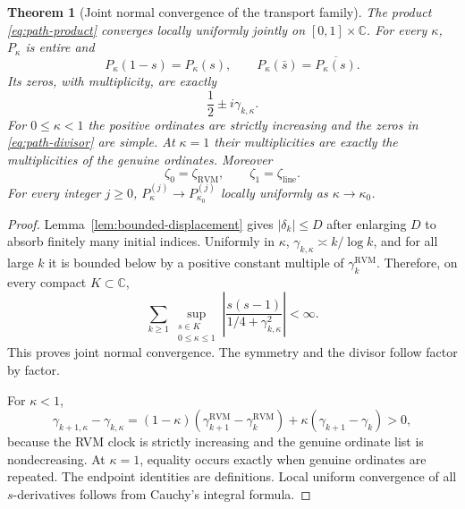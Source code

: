 \documentclass[11pt,reqno]{amsart}
\newtheorem{theorem}{Theorem}[section]
\theoremstyle{definition}
\theoremstyle{remark}
\newcommand{\C}{\mathbb C}
\newcommand{\RVM}{\mathrm{RVM}}
\newcommand{\linez}{\mathrm{line}}
\begin{document}
\begin{theorem}[Joint normal convergence of the transport family]\label{thm:path}
The product \eqref{eq:path-product} converges locally uniformly jointly on $[0,1]\times\C$.  For every $\kappa$, $P_\kappa$ is entire and
\begin{equation}
 P_\kappa(1-s)=P_\kappa(s),
 \qquad
 P_\kappa(\bar s)=\overline{P_\kappa(s)}.
\end{equation}
Its zeros, with multiplicity, are exactly
\begin{equation}\label{eq:path-divisor}
 \frac12\pm i\gamma_{k,\kappa}.
\end{equation}
For $0\le\kappa<1$ the positive ordinates are strictly increasing and the zeros in \eqref{eq:path-divisor} are simple.  At $\kappa=1$ their multiplicities are exactly the multiplicities of the genuine ordinates.  Moreover
\begin{equation}\label{eq:path-endpoints}
 \boxed{
 \zeta_0=\zeta_{\RVM},
 \qquad
 \zeta_1=\zeta_{\linez}.}
\end{equation}
For every integer $j\ge0$, $P_\kappa^{(j)}\to P_{\kappa_0}^{(j)}$ locally uniformly as $\kappa\to\kappa_0$.
\end{theorem}

\begin{proof}
Lemma~\ref{lem:bounded-displacement} gives $|\delta_k|\le D$ after enlarging $D$ to absorb finitely many initial indices.  Uniformly in $\kappa$,
$\gamma_{k,\kappa}\asymp k/\log k$, and for all large $k$ it is bounded below by a positive constant multiple of $\gamma_k^{\RVM}$.  Therefore, on every compact $K\subset\C$,
\[
 \sum_{k\ge1}
 \sup_{\substack{s\in K\\0\le\kappa\le1}}
 \left|\frac{s(s-1)}{1/4+\gamma_{k,\kappa}^2}\right|
 <\infty.
\]
This proves joint normal convergence.  The symmetry and the divisor follow factor by factor.

For $\kappa<1$,
\[
 \gamma_{k+1,\kappa}-\gamma_{k,\kappa}
 =(1-\kappa)(\gamma_{k+1}^{\RVM}-\gamma_k^{\RVM})
 +\kappa(\gamma_{k+1}-\gamma_k)>0,
\]
because the RVM clock is strictly increasing and the genuine ordinate list is nondecreasing.  At $\kappa=1$, equality occurs exactly when genuine ordinates are repeated.  The endpoint identities are definitions.  Local uniform convergence of all $s$-derivatives follows from Cauchy's integral formula.
\end{proof}
\end{document}
